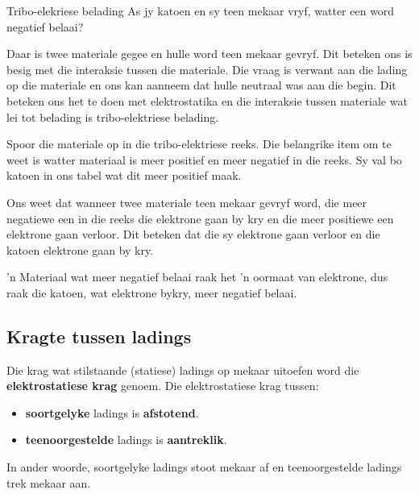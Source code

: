 \begin{wex}{Tribo-elekriese belading}
{
As jy katoen  en sy teen mekaar vryf, watter een word negatief belaai?
}
{

Daar is twee materiale gegee en hulle word teen mekaar gevryf. Dit beteken ons is besig met die interaksie tussen die materiale. Die vraag is verwant aan die lading op die materiale en ons kan aanneem dat hulle neutraal was aan die begin. Dit beteken ons het te doen met elektrostatika en die interaksie tussen materiale wat lei tot belading is tribo-elektriese belading.



Spoor die materiale op in die tribo-elektriese reeks. Die belangrike item om te weet is watter materiaal is meer positief en meer negatief in die reeks. Sy val bo katoen in ons tabel wat dit meer positief maak.

Ons weet dat wanneer twee materiale teen mekaar gevryf word, die meer negatiewe een in die reeks die elektrone gaan by kry en die meer positiewe een elektrone gaan verloor. Dit beteken dat die sy elektrone gaan verloor en die katoen elektrone gaan by kry.
\par
 'n Materiaal wat meer negatief belaai raak het 'n oormaat van elektrone, dus raak die katoen, wat elektrone bykry, meer negatief belaai.
}\end{wex}

\subsection{Kragte tussen ladings}
            \nopagebreak

Die krag wat stilstaande (statiese) ladings op mekaar uitoefen word die \textbf{elektrostatiese krag} genoem. Die elektrostatiese krag tussen:

\begin{itemize}[noitemsep]
\item \textbf{soortgelyke} ladings is \textbf{afstotend}.
\item \textbf{teenoorgestelde} ladings is \textbf{aantreklik}.
\end{itemize}

In ander woorde, soortgelyke ladings stoot mekaar af en teenoorgestelde ladings trek mekaar aan.


